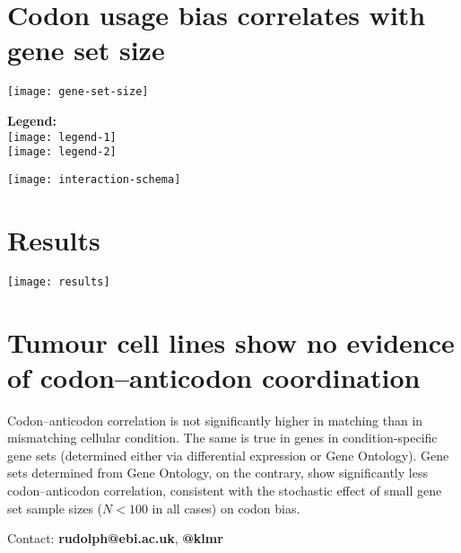 \documentclass[a0,portrait]{a0poster}
\begin{document}
\noindent
\begin{minipage}[][][t]{\textwidth}
    \begin{minipage}[c]{0.48\textwidth}
        \section*{Codon usage bias correlates with gene set size}
        \texttt{[image: gene-set-size]}
    \end{minipage}%
    \hfill
    \begin{minipage}{0.23\textwidth}
        \centering
        \textbf{Legend:}\\[0.5cm]
        \texttt{[image: legend-1]}
        \\[2cm]
        \texttt{[image: legend-2]}
    \end{minipage}%
    \hfill
    \begin{minipage}{0.17\textwidth}
        \centering
        \texttt{[image: interaction-schema]}
    \end{minipage}%
\end{minipage}

\vspace{1cm}
\noindent
\begin{minipage}{\textwidth}
    \begin{minipage}[t]{0.48\textwidth}
        \section*{Results}
        \texttt{[image: results]}
    \end{minipage}%
    \hfill%
    \begin{minipage}[t][][t]{0.48\textwidth}
        \LARGE
        \section*{Tumour cell lines show no evidence of codon--anticodon coordination}
        Codon--anticodon correlation is not significantly higher in matching
        than in mismatching cellular condition. The same is true in genes in
        condition-specific gene sets (determined either via differential
        expression or Gene Ontology). Gene sets determined from Gene Ontology,
        on the contrary, show significantly less codon--anticodon correlation,
        consistent with the stochastic effect of small gene set sample sizes
        (\(N<100\) in all cases) on codon bias.

        \vspace{7cm}
        \hfill Contact: \textbf{rudolph@ebi.ac.uk}, \textbf{@klmr}
    \end{minipage}%
\end{minipage}
\end{document}
